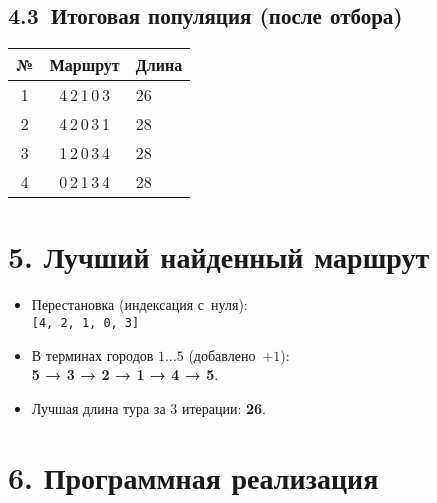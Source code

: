 \documentclass[a4paper,12pt]{article}
\newcommand{\code}[1]{\texttt{#1}}
\begin{document}
\subsection*{4.3 Итоговая популяция (после отбора)}

\begin{center}
\begin{tabular}{ccl}
\toprule
№ & Маршрут & Длина\\\midrule
1 & 4\,2\,1\,0\,3 & 26\\
2 & 4\,2\,0\,3\,1 & 28\\
3 & 1\,2\,0\,3\,4 & 28\\
4 & 0\,2\,1\,3\,4 & 28\\
\bottomrule
\end{tabular}
\end{center}

\section*{5. Лучший найденный маршрут}

\begin{itemize}
  \item Перестановка (индексация с нуля):\\
        \code{[4, 2, 1, 0, 3]}
  \item В терминах городов $1\!\dots 5$ (добавлено $+1$):\\
        \textbf{5 → 3 → 2 → 1 → 4 → 5}.
  \item Лучшая длина тура за 3 итерации: \textbf{26}.
\end{itemize}

\section*{6. Программная реализация}
\end{document}

